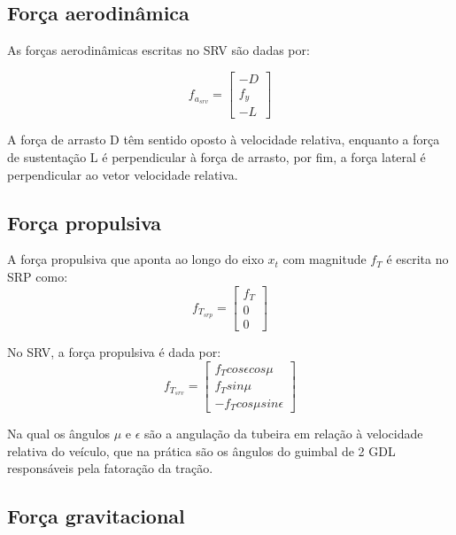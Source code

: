  \subsection{Força aerodinâmica}

 As forças aerodinâmicas escritas no SRV são dadas por:

 \begin{equation}
     f_{a_{srv}} = \left[\begin{array}{l}
-D \\
f_{y} \\
-L
\end{array}\right]
 \end{equation}

 A força de arrasto D têm sentido oposto à velocidade relativa, enquanto a força de sustentação L é perpendicular à força de arrasto, por fim, a força lateral é perpendicular ao vetor velocidade relativa. 

 \subsection{Força propulsiva}
 A força propulsiva que aponta ao longo do eixo $x_{t}$ com magnitude $f_{T}$ é escrita no SRP como:
\begin{equation}
     f_{T_{srp}} = \left[\begin{array}{l}
f_{T} \\
0 \\
0
\end{array}\right]
 \end{equation}

 No SRV, a força propulsiva é dada por:
\begin{equation}
     f_{T_{srv}} = \left[\begin{array}{l}
f_{T} cos \epsilon cos\mu\\
f_{T} sin\mu\\
-f_{T} cos \mu sin\epsilon
\end{array}\right]
 \end{equation}

Na qual os ângulos  $\mu$ e  $\epsilon$ são a angulação da tubeira em relação à velocidade relativa do veículo, que na prática são os ângulos do guimbal de 2 GDL responsáveis pela fatoração da tração. 

\subsection{Força gravitacional}


